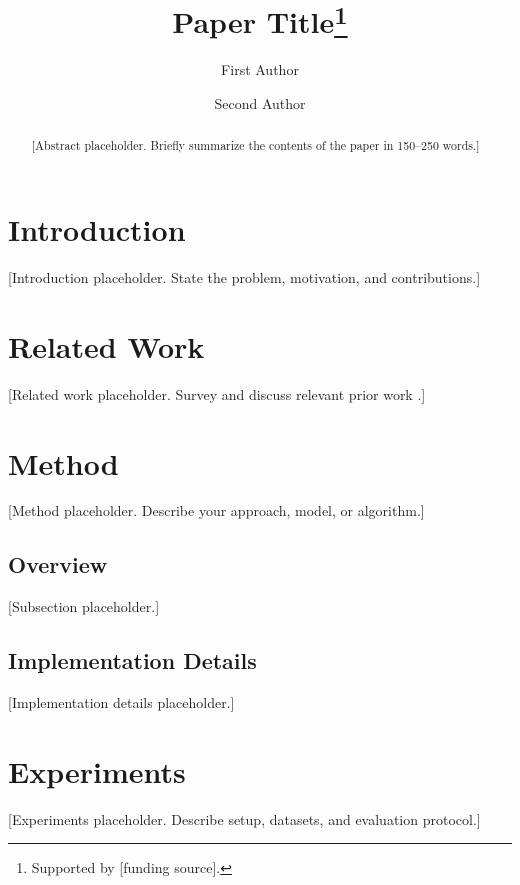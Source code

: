 \documentclass[runningheads]{llncs}
\begin{document}
%
\title{Paper Title\thanks{Supported by [funding source].}}
%
\author{First Author \and
Second Author}
%
%
%
\maketitle
%
\begin{abstract}
[Abstract placeholder. Briefly summarize the contents of the paper in 150--250 words.]

\end{abstract}
%

\section{Introduction}
%
[Introduction placeholder. State the problem, motivation, and contributions.]

%

\section{Related Work}
%
[Related work placeholder. Survey and discuss relevant prior work \cite{author2024title}.]

%

\section{Method}
%
[Method placeholder. Describe your approach, model, or algorithm.]
%
\subsection{Overview}
[Subsection placeholder.]
%
\subsection{Implementation Details}
[Implementation details placeholder.]

%

\section{Experiments}
%
[Experiments placeholder. Describe setup, datasets, and evaluation protocol.]
%
\end{document}
